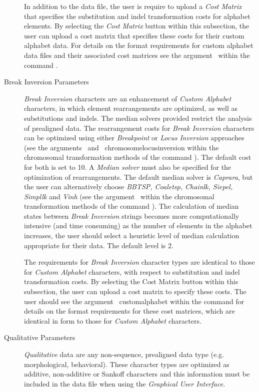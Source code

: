 \begin{description}
		\indent In addition to the data file, the user is require to upload a \emph {Cost Matrix} that specifies 
		the substitution and indel transformation costs for alphabet elements.  By selecting the 
		\emph {Cost Matrix} button within this subsection, the user can upload a cost matrix that 
		specifies these costs for their custom alphabet data. For details on the format requirements for 
		custom alphabet data files and their associated cost matrices see the 
		argument~ within the command 	.

	\item [Break Inversion Parameters] \emph{Break Inversion} characters are an enhancement of 				
		\emph{Custom Alphabet} characters, in which element rearrangements are optimized, as well as
		 substitutions and indels. The median solvers provided restrict the analysis of prealigned data. 
		 The rearrangement costs for \emph{Break Inversion} characters can be optimized using 
		 either \emph{Breakpoint} or \emph{Locus Inversion} approaches (see the 
		 arguments~ and~
		 {chromosomelocusinversion} within the chromosomal transformation methods of the command 
		 ). The default cost for both is set to 10. A \emph{Median solver} must also be 
		 specified for the optimization of rearrangements. The default median solver is \emph{Caprara}, 
		 but the user can alternatively choose \emph{BBTSP, Coaletsp, Chainlk, Siepel, Simpllk} and 
		 \emph{Vinh} (see the argument~ within the 
		 chromosomal transformation methods of the command ).  
		 The calculation of median states between 
		 \emph {Break Inversion} strings becomes more computationally intensive (and time consuming) 
		 as the number of elements in the alphabet increases, the user should select a heuristic level 
		 of median calculation appropriate for their data.  The default level is 2.
		 
		\indent The requirements for \emph{Break Inversion} character types are identical to those for 
		 \emph{Custom Alphabet} characters, with respect to substitution and indel transformation costs. 
		 By selecting the Cost Matrix button within this subsection, the user can upload a 
		 cost matrix to specify these costs. The user should see the argument~
		 {customalphabet} within the command  for details on the format requirements 
		 for these cost matrices, which are identical in form to those for \emph{Custom Alphabet} characters.
 	
	\item [Qualitative Parameters] \emph{Qualitative} data are any non-sequence, prealigned 
		data type (e.g. morphological, behavioral). These character types are optimized as additive, 
		non-additive or Sankoff characters and this information must be included in the data file when 
		using the \emph{Graphical User Interface}.

	\end{description}
		
